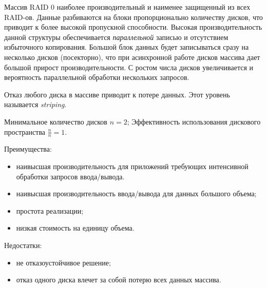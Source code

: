 Массив RAID 0 наиболее производительный и наименее защищенный из всех RAID-ов. Данные разбиваются на блоки пропорционально количеству дисков, что приводит к более высокой пропускной способности. Высокая производительность данной структуры обеспечивается \emph{параллельной} записью и отсутствием избыточного копирования. Большой блок данных будет записываться сразу на несколько дисков (посекторно), что при асинхронной работе дисков массива дает большой прирост производительности. С ростом числа дисков увеличивается и вероятность параллельной обработки нескольких запросов. 

Отказ любого диска в массиве приводит к потере данных. Этот уровень называется \emph{striping}.

Минимальное количество дисков $n=2$; Эффективность использования дискового пространства $\frac{n}{n}=1$.

Преимущества:
\begin{itemize}
    \item наивысшая производительность для приложений требующих интенсивной обработки запросов ввода/вывода.
    \item наивысшая производительность ввода/вывода для данных большого объема;
    \item простота реализации;
    \item низкая стоимость на единицу объема. 
\end{itemize}

Недостатки:
\begin{itemize}
    \item не отказоустойчивое решение;
    \item отказ одного диска влечет за собой потерю всех данных массива.
\end{itemize}


